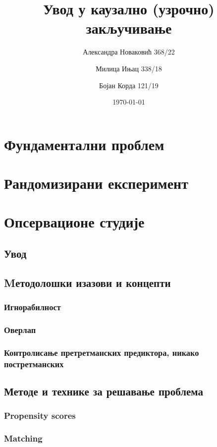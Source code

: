 \documentclass[12pt, a4paper]{article}
\title{Увод у каузално (узрочно) закључивање}
\author{Александра Новаковић 368/22}
\author{Милица Ињац 338/18}
\author{Бојан Корда 121/19}
\affil{Математички факултет, Универзитет у Београду}
\date{\today}
\begin{document}
\maketitle
\newpage

\tableofcontents
\newpage

\section{Фундаментални проблем}
\newpage



\section{Рандомизирани експеримент}
\newpage



\section{Опсервационе студије}

\subsection{Увод}


\subsection{Mетодолошки изазови и концепти}
\subsubsection{Игнорабилност}
\subsubsection{Оверлап}
\subsubsection{Контролисање претретманских предиктора, никако постретманских}
\subsection{Методе и технике за решавање проблема}
\subsubsection{Propensity scores}
\subsubsection{Matching}
\end{document}
